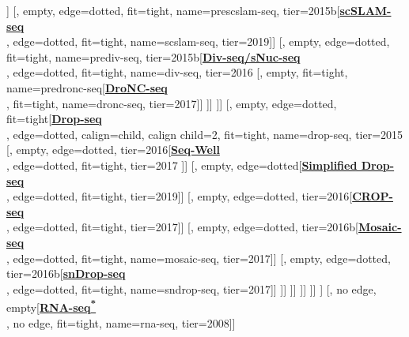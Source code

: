 \documentclass[12pt, a4]{article}
\begin{document}
\begin{center}
\begin{forest}
						[, empty, edge=dotted, tier=2015b[\href{https://www.nature.com/articles/nbt.4259}{\textbf{ScISOr-seq}}\\\citealt{gupta2018}, edge=dotted, fit=tight, tier=2018]]
						[, empty, edge=dotted, fit=tight, name=prescslam-seq, tier=2015b[\href{https://www.nature.com/articles/s41586-019-1369-y}{\textbf{scSLAM-seq}}\\\citealt{erhard2019}, edge=dotted, fit=tight, name=scslam-seq, tier=2019]]
						[, empty, edge=dotted, fit=tight, name=prediv-seq, tier=2015b[\href{https://science.sciencemag.org/content/353/6302/925.long}{\textbf{Div-seq/sNuc-seq}}\\\citealt{habib2016}, edge=dotted, fit=tight, name=div-seq, tier=2016
							[, empty, fit=tight, name=predronc-seq[\href{https://www.nature.com/articles/nmeth.4407}{\textbf{DroNC-seq}}\\\citealt{habib2017}, fit=tight, name=dronc-seq, tier=2017]]
						]]
				]]
				[, empty, edge=dotted, fit=tight[\href{https://www.cell.com/abstract/S0092-8674(15)00549-8}{\textbf{Drop-seq}}\\\citealt{macosko2015}, edge=dotted, calign=child, calign child=2, fit=tight, name=drop-seq, tier=2015
					[, empty, edge=dotted, tier=2016[\href{https://www.nature.com/articles/nmeth.4179}{\textbf{Seq-Well}}\\\citealt{gierahn2017}, edge=dotted, fit=tight, tier=2017
					]]
					[, empty, edge=dotted[\href{https://pubs.rsc.org/en/content/articlelanding/2019/lc/c9lc00014c}{\textbf{Simplified Drop-seq}}\\\citealt{biocanin2019}, edge=dotted, fit=tight, tier=2019]]
					[, empty, edge=dotted, tier=2016[\href{https://www.nature.com/articles/nmeth.4177}{\textbf{CROP-seq}}\\\citealt{datlinger2017}, edge=dotted, fit=tight, tier=2017]]
					[, empty, edge=dotted, tier=2016b[\href{https://www.sciencedirect.com/science/article/pii/S1097276517301740}{\textbf{Mosaic-seq}}\\\citealt{xie2017}, edge=dotted, fit=tight, name=mosaic-seq, tier=2017]]
					[, empty, edge=dotted, tier=2016b[\href{https://www.nature.com/articles/nbt.4038}{\textbf{snDrop-seq}}\\\citealt{lake2017a}, edge=dotted, fit=tight, name=sndrop-seq, tier=2017]]
				]]
			]]
		]]
	]] %
	]
	[, no edge, empty[\href{https://doi.org/10.1038/nmeth.1226}{\textbf{RNA-seq\textsuperscript{\textbf{\large{*}}}}}\\\citealt{mortazavi2008}, no edge, fit=tight, name=rna-seq, tier=2008]]

\end{forest}
\end{center}
\end{document}
